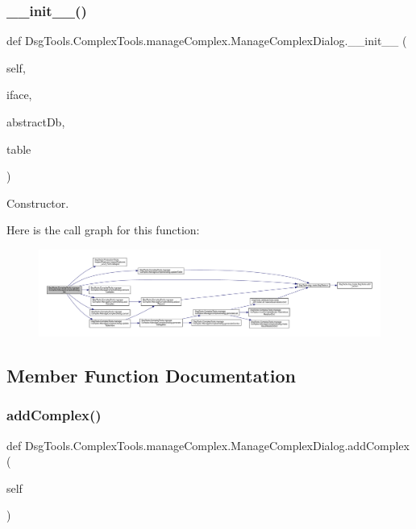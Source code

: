 \subsubsection{\texorpdfstring{\+\_\+\+\_\+init\+\_\+\+\_\+()}{\_\_init\_\_()}}
{\footnotesize\ttfamily def Dsg\+Tools.\+Complex\+Tools.\+manage\+Complex.\+Manage\+Complex\+Dialog.\+\_\+\+\_\+init\+\_\+\+\_\+ (\begin{DoxyParamCaption}\item[{}]{self,  }\item[{}]{iface,  }\item[{}]{abstract\+Db,  }\item[{}]{table }\end{DoxyParamCaption})}

\begin{DoxyVerb}Constructor.
\end{DoxyVerb}
 Here is the call graph for this function\+:
\nopagebreak
\begin{figure}[H]
\begin{center}
\leavevmode
\includegraphics[width=350pt]{class_dsg_tools_1_1_complex_tools_1_1manage_complex_1_1_manage_complex_dialog_a50b42ae19f98e4132c397b96dd580b1e_cgraph}
\end{center}
\end{figure}


\subsection{Member Function Documentation}
\mbox{\label{class_dsg_tools_1_1_complex_tools_1_1manage_complex_1_1_manage_complex_dialog_a699449c936f5f42b3386bda4dd56f89c}} 
\subsubsection{\texorpdfstring{add\+Complex()}{addComplex()}}
{\footnotesize\ttfamily def Dsg\+Tools.\+Complex\+Tools.\+manage\+Complex.\+Manage\+Complex\+Dialog.\+add\+Complex (\begin{DoxyParamCaption}\item[{}]{self }\end{DoxyParamCaption})}

